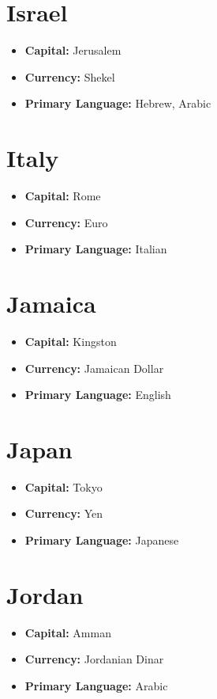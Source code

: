 \documentclass[a4paper,100pt,twoside]{book}
\begin{document}
\section*{\Huge Israel}
\vspace{5mm} %
\begin{itemize}
	\item \textbf{Capital:} Jerusalem
	\item \textbf{Currency:} Shekel
	\item \textbf{Primary Language:} Hebrew, Arabic
\end{itemize}

\section*{\Huge Italy}
\vspace{5mm} %
\begin{itemize}
	\item \textbf{Capital:} Rome
	\item \textbf{Currency:} Euro
	\item \textbf{Primary Language:} Italian
\end{itemize}

\section*{\Huge Jamaica}
\vspace{5mm} %
\begin{itemize}
	\item \textbf{Capital:} Kingston
	\item \textbf{Currency:} Jamaican Dollar
	\item \textbf{Primary Language:} English
\end{itemize}

\section*{\Huge Japan}
\vspace{5mm} %
\begin{itemize}
	\item \textbf{Capital:} Tokyo
	\item \textbf{Currency:} Yen
	\item \textbf{Primary Language:} Japanese
\end{itemize}

\section*{\Huge Jordan}
\vspace{5mm} %
\begin{itemize}
	\item \textbf{Capital:} Amman
	\item \textbf{Currency:} Jordanian Dinar
	\item \textbf{Primary Language:} Arabic
\end{itemize}
\end{document}

